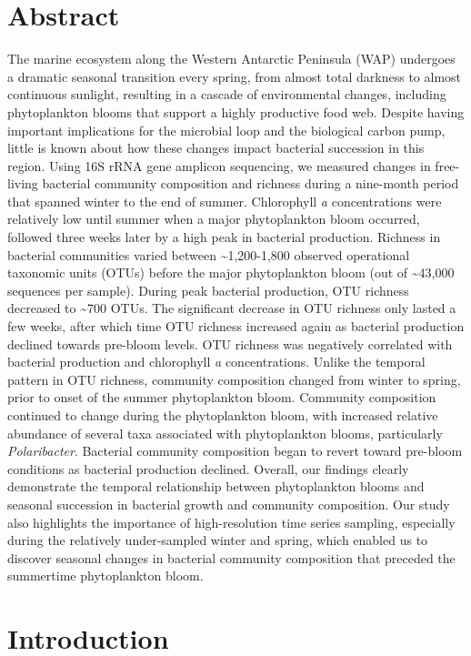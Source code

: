 \section{Abstract}\label{sc:abstract2}
The marine ecosystem along the Western Antarctic Peninsula (WAP) undergoes a dramatic seasonal transition every spring, from almost total darkness to almost continuous sunlight, resulting in a cascade of environmental changes, including phytoplankton blooms that support a highly productive food web. Despite having important implications for the microbial loop and the biological carbon pump, little is known about how these changes impact bacterial succession in this region. Using 16S rRNA gene amplicon sequencing, we measured changes in free-living bacterial community composition and richness during a nine-month period that spanned winter to the end of summer. Chlorophyll \emph{a} concentrations were relatively low until summer when a major phytoplankton bloom occurred, followed three weeks later by a high peak in bacterial production. Richness in bacterial communities varied between \textasciitilde{}1,200-1,800 observed operational taxonomic units (OTUs) before the major phytoplankton bloom (out of \textasciitilde{}43,000 sequences per sample). During peak bacterial production, OTU richness decreased to \textasciitilde{}700 OTUs. The significant decrease in OTU richness only lasted a few weeks, after which time OTU richness increased again as bacterial production declined towards pre-bloom levels. OTU richness was negatively correlated with bacterial production and chlorophyll \textit{a} concentrations. Unlike the temporal pattern in OTU richness, community composition changed from winter to spring, prior to onset of the summer phytoplankton bloom. Community composition continued to change during the phytoplankton bloom, with increased relative abundance of several taxa associated with phytoplankton blooms, particularly \textit{Polaribacter}. Bacterial community composition began to revert toward pre-bloom conditions as bacterial production declined. Overall, our findings clearly demonstrate the temporal relationship between phytoplankton blooms and seasonal succession in bacterial growth and community composition. Our study also highlights the importance of high-resolution time series sampling, especially during the relatively under-sampled winter and spring, which enabled us to discover seasonal changes in bacterial community composition that preceded the summertime phytoplankton bloom.

\section{Introduction}\label{introduction2}

